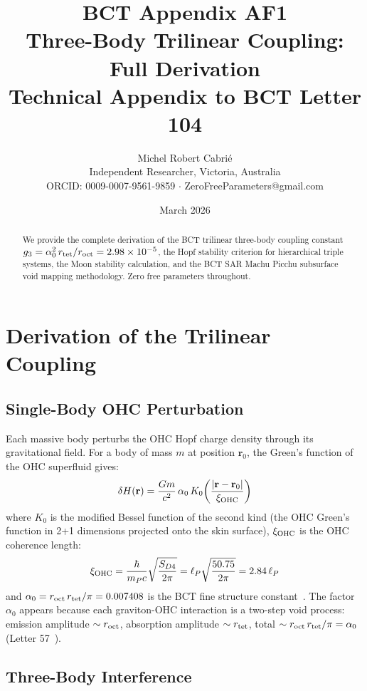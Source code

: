 \documentclass[twocolumn,10pt]{article}
\title{\textbf{BCT Appendix AF1}\\
Three-Body Trilinear Coupling: Full Derivation\\
\large Technical Appendix to BCT Letter 104}
\author{Michel Robert Cabri\'{e}\\
\small Independent Researcher, Victoria, Australia\\
\small ORCID: 0009-0007-9561-9859 $\cdot$ ZeroFreeParameters@gmail.com}
\date{March 2026}
\begin{document}
\maketitle

\begin{abstract}
We provide the complete derivation of the BCT trilinear three-body coupling constant
$g_3 = \alpha_0^2\,r_{\rm tet}/r_{\rm oct} = 2.98\times10^{-5}$, the Hopf stability
criterion for hierarchical triple systems, the Moon stability calculation, and the
BCT SAR Machu Picchu subsurface void mapping methodology. Zero free parameters throughout.
\end{abstract}

\section{Derivation of the Trilinear Coupling}

\subsection{Single-Body OHC Perturbation}

Each massive body perturbs the OHC Hopf charge density through its gravitational field.
For a body of mass $m$ at position $\mathbf{r}_0$, the Green's function of the OHC
superfluid gives:
%
\begin{equation}
\delta H(\mathbf{r}) = \frac{Gm}{c^2}\,\alpha_0\,
K_0\!\left(\frac{|\mathbf{r}-\mathbf{r}_0|}{\xi_{\rm OHC}}\right)
\end{equation}
%
where $K_0$ is the modified Bessel function of the second kind (the OHC Green's function
in 2+1 dimensions projected onto the skin surface), $\xi_{\rm OHC}$ is the OHC coherence
length:
%
\begin{equation}
\xi_{\rm OHC} = \frac{\hbar}{m_P c}\sqrt{\frac{S_{D4}}{2\pi}} 
= \ell_P\sqrt{\frac{50.75}{2\pi}} = 2.84\,\ell_P
\end{equation}
%
and $\alpha_0 = r_{\rm oct}\,r_{\rm tet}/\pi = 0.007408$ is the BCT fine structure
constant~\cite{bct_l1}. The factor $\alpha_0$ appears because each graviton-OHC
interaction is a two-step void process: emission amplitude $\sim r_{\rm oct}$, absorption
amplitude $\sim r_{\rm tet}$, total $\sim r_{\rm oct}\,r_{\rm tet}/\pi = \alpha_0$
(Letter 57~\cite{bct_l57}).

\subsection{Three-Body Interference}
\end{document}
